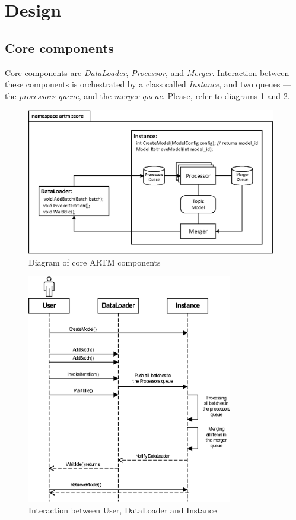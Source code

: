 \documentclass[11pt,a4paper,twoside]{report}
\begin{document}
\section{Design}

\subsection{Core components}

Core components are \emph{DataLoader}, \emph{Processor}, and \emph{Merger}.
Interaction between these components is orchestrated by a class called \emph{Instance},
and two queues --- the \emph{processors queue}, and the \emph{merger queue}.
Please, refer to diagrams \ref{fig:diagramm_artm_core} and \ref{fig:diagramm_workflow}.

\begin{figure}[h!]
\begin{centering}
\includegraphics[height=64mm]{diagramm_artm_core.eps}
\caption{Diagram of core ARTM components}
\label{fig:diagramm_artm_core}
\end{centering}
\end{figure}
\vspace{1ex}

\begin{figure}[h!]
\begin{centering}
\includegraphics[width=90mm]{diagramm_workflow.eps}
\caption{Interaction between User, DataLoader and Instance}
\label{fig:diagramm_workflow}
\end{centering}
\end{figure}
\end{document}
